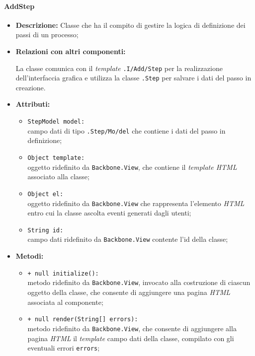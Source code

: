 \paragraph{AddStep}
\label{addStep}
\begin{flushleft}
\begin{itemize}
\item \textbf{Descrizione:} Classe che ha il compito di gestire la logica di definizione dei passi di un processo;
\item \textbf{Relazioni con altri componenti:}
\begin{sloppypar}
La classe comunica con il \textit{template} \texttt{\viewAdmin{}.I\fshyp{}Add\fshyp{}Step} per la realizzazione dell'interfaccia grafica e utilizza la classe \texttt{\model{}.Step} per salvare i dati del passo in creazione.
\end{sloppypar}
\item \textbf{Attributi:}
\begin{sloppypar}
\begin{itemize}
\item \texttt{StepModel model:}\\ campo dati di tipo \texttt{\model{}.Step\fshyp{}Mo\fshyp{}del} che contiene i dati del passo in definizione;
\item \texttt{Object template:}\\ oggetto ridefinito da \texttt{Backbone.View}, che contiene il \textit{template HTML} associato alla classe;
\item \texttt{Object el:}\\ oggetto ridefinito da \texttt{Backbone.View} che rappresenta l'elemento \textit{HTML} entro cui la classe ascolta eventi generati dagli utenti;
\item \texttt{String id:}\\ campo dati ridefinito da \texttt{Backbone.View} contente l'id della classe;
\end{itemize}
\end{sloppypar}
\item \textbf{Metodi:}
\begin{sloppypar}
\begin{itemize}
\item \texttt{+ null initialize():}\\ metodo ridefinito da \texttt{Backbone.View}, invocato alla costruzione di ciascun oggetto della classe, che consente di aggiungere una pagina \textit{HTML} associata al componente;
\item \texttt{+ null render(String[] errors):}\\ metodo ridefinito da \texttt{Backbone.View}, che consente di aggiungere alla pagina \textit{HTML} il \textit{template} campo dati della classe, compilato con gli eventuali errori \texttt{errors};

\end{itemize}
\end{sloppypar}
\end{itemize}
\end{flushleft}

